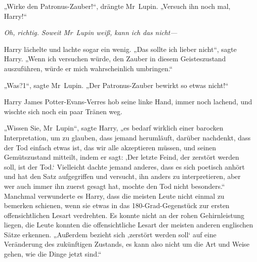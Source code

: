 „Wirke den Patronus-Zauber!“, drängte Mr~Lupin. „Versuch ihn noch mal, Harry!“

\emph{Oh, richtig. Soweit Mr~Lupin weiß, kann ich das nicht—}

Harry lächelte und lachte sogar ein wenig.
„Das sollte ich lieber nicht“, sagte Harry. „Wenn ich versuchen würde, den Zauber in diesem Geisteszustand auszuführen, würde er mich wahrscheinlich umbringen.“

„Was?1“, sagte Mr~Lupin. „Der Patronus-Zauber bewirkt so etwas nicht!“

Harry James Potter-Evans-Verres hob seine linke Hand, immer noch lachend, und wischte sich noch ein paar Tränen weg.

„Wissen Sie, Mr~Lupin“, sagte Harry, „es bedarf wirklich einer barocken Interpretation, um zu glauben, dass jemand herumläuft, darüber nachdenkt, dass der Tod einfach etwas ist, das wir alle akzeptieren müssen, und seinen Gemütszustand mitteilt, indem er sagt: ‚Der letzte Feind, der zerstört werden soll, ist der Tod.‘ Vielleicht dachte jemand anderes, dass es sich poetisch anhört und hat den Satz aufgegriffen und versucht, ihn anders zu interpretieren, aber wer auch immer ihn zuerst gesagt hat, mochte den Tod nicht besonders.“
Manchmal verwunderte es Harry, dass die meisten Leute nicht einmal zu bemerken schienen, wenn sie etwas in das 180-Grad-Gegenstück zur ersten offensichtlichen Lesart verdrehten. Es konnte nicht an der rohen Gehirnleistung liegen, die Leute konnten die offensichtliche Lesart der meisten anderen englischen Sätze erkennen. „Außerdem bezieht sich ‚zerstört werden soll‘ auf eine Veränderung des zukünftigen Zustands, es kann also nicht um die Art und Weise gehen, wie die Dinge jetzt sind.“

